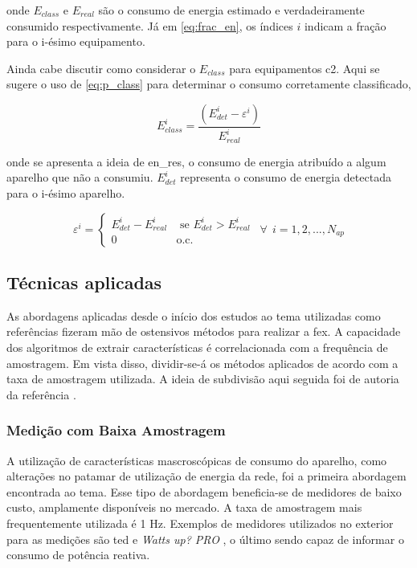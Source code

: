 \noindent onde $E_{class}$ e $E_{real}$ são o consumo de energia
estimado e verdadeiramente consumido respectivamente. Já em
\ref{eq:frac_en}, os índices $i$ indicam a fração para o i-ésimo
equipamento.

Ainda cabe discutir como considerar o $E_{class}$ para equipamentos
\gls{c2}. Aqui se sugere o uso de \ref{eq:p_class} para determinar o
consumo corretamente classificado,

\begin{equation}\label{eq:p_class}
E_{class}^i = \frac{(E_{det}^i-\varepsilon^i)}{E_{real}^i}
\end{equation}

\noindent onde se apresenta a ideia de \gls{en_res}, o consumo de
energia atribuído a algum aparelho que não a consumiu. $E_{det}^i$
representa o consumo de energia detectada para o i-ésimo aparelho.

\begin{equation}\label{eq:en_res}
\varepsilon^i = \left\{\begin{array}{rl}
 E_{det}^i - E_{real}^i &\mbox{ se $E_{det}^i>E_{real}^i$} \\
 0 &\mbox{o.c.}
\end{array} \right. ~~ \forall ~~ i = 1,2,...,N_{ap}
\end{equation}


\subsection{Técnicas aplicadas}
\label{ssec:nilm_tecnicas}

As abordagens aplicadas desde o início dos estudos ao tema utilizadas
como referências fizeram mão de ostensivos métodos para realizar a
\gls{fex}. A capacidade dos algoritmos de extrair características é
correlacionada com a frequência de amostragem. Em vista disso,
dividir-se-á os métodos aplicados de acordo com a taxa de amostragem
utilizada. A ideia de subdivisão aqui seguida foi de autoria da
referência \cite{nilm_zeifman_review_2011}.

\subsubsection{Medição com Baixa Amostragem}
\label{sssec:nilm_baixa_am}

A utilização de características mascroscópicas de consumo do aparelho,
como alterações no patamar de utilização de energia da rede, foi a
primeira abordagem encontrada ao tema. Esse tipo de abordagem
beneficia-se de medidores de baixo custo, amplamente disponíveis no
mercado. A taxa de amostragem mais frequentemente utilizada é 1 Hz.
Exemplos de medidores utilizados no exterior para as medições são
\gls{ted} \cite{ted_site} e \emph{Watts up? PRO} \cite{wattsup_site},
o último sendo capaz de informar o consumo de potência reativa.

